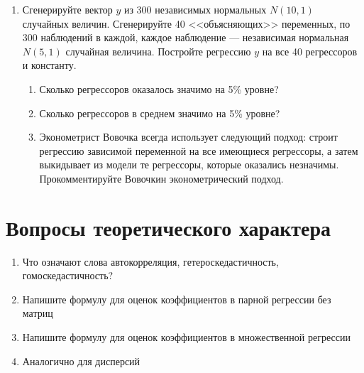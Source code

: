 \documentclass[pdftex,12pt,a4paper]{article}
\newcommand{\solution}[1]{}
\begin{document}
\begin{enumerate}
\item Сгенерируйте вектор $y$ из 300 независимых нормальных $N(10,1)$ случайных величин. Сгенерируйте 40 <<объясняющих>> переменных, по 300 наблюдений в каждой, каждое наблюдение --- независимая нормальная $N(5,1)$ случайная величина. Постройте регрессию $y$ на все 40 регрессоров и константу. 
\begin{enumerate}
\item Сколько регрессоров оказалось значимо на 5\% уровне?
\item Сколько регрессоров в среднем значимо на 5\% уровне?
\item Эконометрист Вовочка всегда использует следующий подход: строит регрессию зависимой переменной на все имеющиеся регрессоры, а затем выкидывает из модели те регрессоры, которые оказались незначимы. Прокомментируйте Вовочкин эконометрический подход.
\end{enumerate}
\solution{}




\end{enumerate}


\section{Вопросы теоретического характера}

\begin{enumerate}
\item Что означают слова автокорреляция, гетероскедастичность, гомоскедастичность?
\item Напишите формулу для оценок коэффициентов в парной регрессии без матриц
\item Напишите формулу для оценок коэффициентов в множественной регрессии 
\item Аналогично для дисперсий

\end{enumerate}
\end{document}
